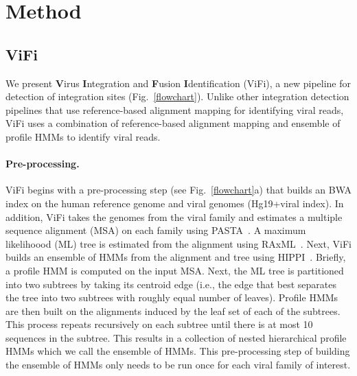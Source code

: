 \documentclass[12pt]{article}
\begin{document}
\section{Method}
\subsection{ViFi}
We present \textbf{V}irus \textbf{I}ntegration and \textbf{F}usion \textbf{I}dentification (ViFi), a new pipeline for detection of integration sites (Fig.~\ref{flowchart}).  Unlike other integration detection pipelines that use reference-based alignment mapping for identifying viral reads, ViFi uses a combination of reference-based alignment mapping and ensemble of profile HMMs to identify viral reads.  

\paragraph{\textbf{Pre-processing.}} ViFi begins with a pre-processing step (see Fig.~\ref{flowchart}a) that builds an BWA index on the human reference genome and viral genomes (Hg19+viral index).  In addition, ViFi takes the genomes from the viral family and estimates a multiple sequence alignment (MSA) on each family using PASTA~\cite{Mirarab2014}.  A maximum likelihoood (ML) tree is estimated from the alignment using RAxML~\cite{Stamatakis2014}.  Next, ViFi builds an ensemble of HMMs from the alignment and tree using HIPPI~\cite{Nguyen2016_hippi}.  Briefly, a profile HMM is computed on the input MSA.  Next, the ML tree is partitioned into two subtrees by taking its centroid edge (i.e., the edge that best separates the tree into two subtrees with roughly equal number of leaves).  Profile HMMs are then built on the alignments induced by the leaf set of each of the subtrees.  This process repeats recursively on each subtree until there is at most 10 sequences in the subtree.  This results in a collection of nested hierarchical profile HMMs which we call the ensemble of HMMs.  This pre-processing step of building the ensemble of HMMs only needs to be run once for each viral family of interest.
\end{document}
